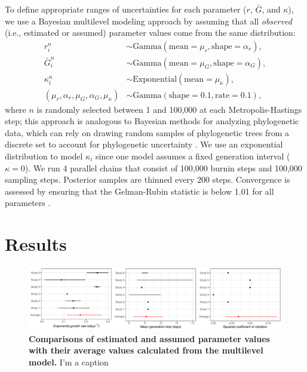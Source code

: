 \documentclass[12pt]{article}
\begin{document}
To define appropriate ranges of uncertainties for each parameter ($r$, $\bar G$, and $\kappa$),
we use a Bayesian multilevel modeling approach by assuming that all \emph{observed} (i.e., estimated or assumed) parameter values come from the same distribution:
\begin{equation}
\begin{aligned}
r_i^n &\sim \mathrm{Gamma}(\mathrm{mean}=\mu_r, \mathrm{shape}=\alpha_r),\\
\bar{G}_i^n &\sim \mathrm{Gamma}(\mathrm{mean}=\mu_G, \mathrm{shape}=\alpha_G),\\
\kappa_i^n &\sim \mathrm{Exponential}(\mathrm{mean}=\mu_\kappa),\\
(\mu_r, \alpha_r, \mu_G, \alpha_G, \mu_\kappa) &\sim \mathrm{Gamma}(\mathrm{shape}=0.1, \mathrm{rate}=0.1),
\end{aligned}
\end{equation}
where $n$ is randomly selected between 1 and 100,000 at each Metropolis-Hastings step;
this approach is analogous to Bayesian methods for analyzing phylogenetic data, which can rely on drawing random samples of phylogenetic trees from a discrete set to account for phylogenetic uncertainty \citep{pagel2004bayesian,bedford2014integrating}.
We use an exponential distribution to model $\kappa_i$ since one model assumes a fixed generation interval ($\kappa = 0$).
We run 4 parallel chains that consist of 100,000 burnin steps and 100,000 sampling steps.
Posterior samples are thinned every 200 steps.
Convergence is assessed by ensuring that the Gelman-Rubin statistic is below 1.01 for all parameters \citep{gelman1992inference}.

\section{Results}

\begin{figure}[!ht]
\includegraphics[width=\textwidth]{compare_assumption.pdf}
\caption{
\textbf{Comparisons of estimated and assumed parameter values with their average values calculated from the multilevel model.}
I'm a caption
}
\label{fig:assumption}
\end{figure}
\end{document}
